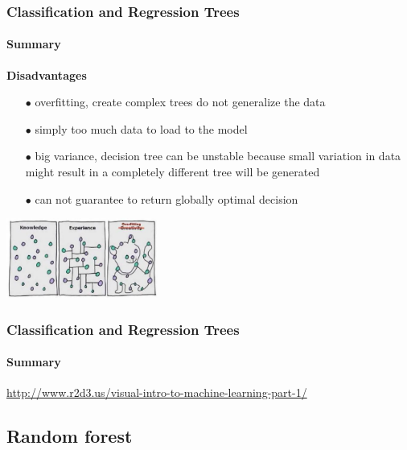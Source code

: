 \begin{frame}
	\frametitle{Classification and Regression Trees}
		\framesubtitle{Summary}

		
		\textbf{Disadvantages}
		\begin{center}
		\begin{itemize}
		   \item[$\bullet$] overfitting, create complex trees do not generalize the data
		   \item[$\bullet$] simply too much data to load to the model 
		   \item[$\bullet$] big variance, decision tree can be unstable because small variation in data might result  in a completely different tree will be generated
		   \item[$\bullet$] can not guarantee to return globally optimal decision
		\end{itemize}
		
		\vfill
		
		\includegraphics[width=5cm]{./figures/cons}
		\end{center}
		
\end{frame}

\begin{frame}	
\frametitle{Classification and Regression Trees}
\framesubtitle{Summary}
\bigbreak
\bigbreak

\url{http://www.r2d3.us/visual-intro-to-machine-learning-part-1/}\bigbreak

\end{frame}


\subsection{Random forest} %

